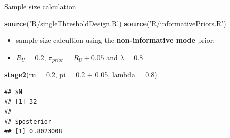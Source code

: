 \documentclass{beamer}
\newenvironment{Shaded}{}{}
\newcommand{\KeywordTok}[1]{\textcolor[rgb]{0.00,0.44,0.13}{\textbf{{#1}}}}
\newcommand{\DataTypeTok}[1]{\textcolor[rgb]{0.56,0.13,0.00}{{#1}}}
\newcommand{\FloatTok}[1]{\textcolor[rgb]{0.25,0.63,0.44}{{#1}}}
\newcommand{\StringTok}[1]{\textcolor[rgb]{0.25,0.44,0.63}{{#1}}}
\newcommand{\NormalTok}[1]{{#1}}
\begin{document}
\begin{frame}[fragile]{Sample size calculation}

\begin{Shaded}
\begin{Highlighting}[]
\KeywordTok{source}\NormalTok{(}\StringTok{'R/singleThresholdDesign.R'}\NormalTok{)}
\KeywordTok{source}\NormalTok{(}\StringTok{'R/informativePriors.R'}\NormalTok{)}
\end{Highlighting}
\end{Shaded}

\begin{itemize}
\item
  sample size calcultion using the \textbf{non-informative mode} prior:
\item
  \(R_U=0.2\), \(\pi_{prior}=R_U+0.05\) and \(\lambda=0.8\)
\end{itemize}


\begin{Shaded}
\begin{Highlighting}[]
\KeywordTok{stage2}\NormalTok{(}\DataTypeTok{ru =} \FloatTok{0.2}\NormalTok{, }\DataTypeTok{pi =} \FloatTok{0.2} \NormalTok{+}\StringTok{ }\FloatTok{0.05}\NormalTok{, }\DataTypeTok{lambda =} \FloatTok{0.8}\NormalTok{)}
\end{Highlighting}
\end{Shaded}

\begin{verbatim}
## $N
## [1] 32
## 
## $posterior
## [1] 0.8023008
\end{verbatim}

\end{frame}
\end{document}
